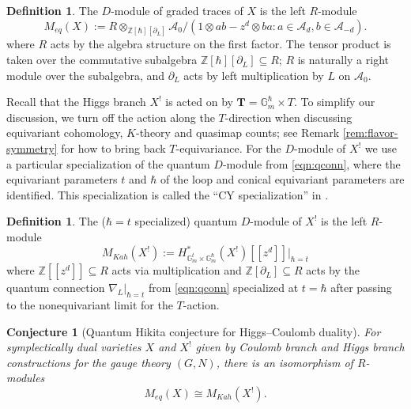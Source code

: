 \documentclass[reqno]{amsart}
\numberwithin{equation}{section}
\numberwithin{equation}{section}
\numberwithin{equation}{section}
\newtheorem{conj}[thm]{Conjecture}
\theoremstyle{definition}
\newtheorem{defn}[thm]{Definition}
\theoremstyle{remark}
\theoremstyle{remark}
\begin{document}
\begin{defn}
    The $D$-module of graded traces of $X$ is the left $R$-module
    \begin{equation}
        M_{ eq}(X) := R \otimes_{\mathbb{Z}[\hbar][\partial_L]} \mathcal{A}_0 / ( 1 \otimes ab - z^d \otimes ba : a \in \mathcal{A}_{d}, b \in \mathcal{A}_{-d}).
    \end{equation}
    where $R$ acts by the algebra structure on the first factor. The tensor product is taken over the commutative subalgebra $\mathbb{Z}[\hbar][\partial_L] \subseteq R$; $R$ is naturally a right module over the subalgebra, and $\partial_L$ acts by left multiplication by $L$ on $\mathcal{A}_0$.
\end{defn}

Recall that the Higgs branch $X^!$ is acted on by $\mathbf{T} = \mathbb{G}_m^{\hbar} \times T$. To simplify our discussion, we turn off the action along the $T$-direction when discussing equivariant cohomology, $K$-theory and quasimap counts; see Remark \ref{rem:flavor-symmetry} for how to bring back $T$-equivariance. For the $D$-module of $X^!$ we use a particular specialization of the quantum $D$-module from \cref{eqn:qconn}, where the equivariant parameters $t$ and $\hbar$ of the loop and conical equivariant parameters are identified. This specialization is called the  ``CY specialization'' in \cite[Remark 4.3]{KMP21}.

\begin{defn}
    The ($\hbar=t$ specialized) quantum $D$-module of $X^!$ is the left $R$-module
    \begin{equation}
        M_{Kah}(X^!) := H^*_{\mathbb{G}_m^{t} \times \mathbb{G}_m^{\hbar}}(X^!)[\![z^d]\!]|_{\hbar = t}
    \end{equation}
    where $\mathbb{Z}[\![z^d]\!] \subseteq R$ acts via multiplication and $\mathbb{Z}[\partial_L] \subseteq R$ acts by the quantum connection $\nabla_L|_{\hbar = t}$ from \cref{eqn:qconn} specialized at $t = \hbar$ after passing to the nonequivariant limit for the $T$-action.
\end{defn}

\begin{conj}[Quantum Hikita conjecture \cite{KMP21} for Higgs--Coulomb duality]
    For symplectically dual varieties $X$ and $X^!$ given by Coulomb branch and Higgs branch constructions for the gauge theory $(G, N)$, there is an isomorphism of $R$-modules
    \begin{equation}
        M_{eq}(X) \cong M_{Kah}(X^!).
    \end{equation}
\end{conj}
\end{document}
